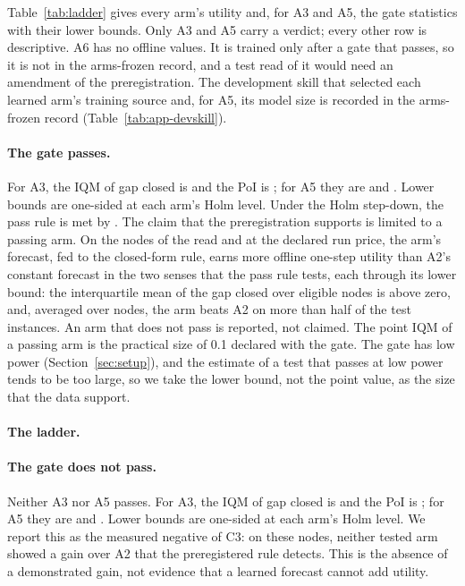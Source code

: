 Table~\ref{tab:ladder} gives every arm's utility and, for A3 and A5, the gate statistics with their lower bounds. Only A3 and A5 carry a verdict; every other row is descriptive. A6 has no offline values. It is trained only after a gate that passes, so it is not in the arms-frozen record, and a test read of it would need an amendment of the preregistration. The development skill that selected each learned arm's training source and, for A5, its model size is recorded in the arms-frozen record (Table~\ref{tab:app-devskill}).

\ifGatePassed
\paragraph{The gate passes.}
For A3, the IQM of gap closed is \GateIQMAThree{} and the PoI is \GatePoIAThree; for A5 they are \GateIQMAFive{} and \GatePoIAFive. Lower bounds are one-sided at each arm's Holm level. Under the Holm step-down, the pass rule is met by \GatePassingArms. The claim that the preregistration supports is limited to a passing arm. On the nodes of the read and at the declared run price, the arm's forecast, fed to the closed-form rule, earns more offline one-step utility than A2's constant forecast in the two senses that the pass rule tests, each through its lower bound: the interquartile mean of the gap closed over eligible nodes is above zero, and, averaged over nodes, the arm beats A2 on more than half of the test instances. An arm that does not pass is reported, not claimed. The point IQM of a passing arm is  the practical size of 0.1 declared with the gate.  The gate has low power (Section~\ref{sec:setup}), and the estimate of a test that passes at low power tends to be too large, so we take the lower bound, not the point value, as the size that the data support.

\paragraph{The ladder.}
\else
\paragraph{The gate does not pass.}
Neither A3 nor A5 passes. For A3, the IQM of gap closed is \GateIQMAThree{} and the PoI is \GatePoIAThree; for A5 they are \GateIQMAFive{} and \GatePoIAFive. Lower bounds are one-sided at each arm's Holm level.  We report this as the measured negative of C3: on these nodes, neither tested arm showed a gain over A2 that the preregistered rule detects. This is the absence of a demonstrated gain, not evidence that a learned forecast cannot add utility.

